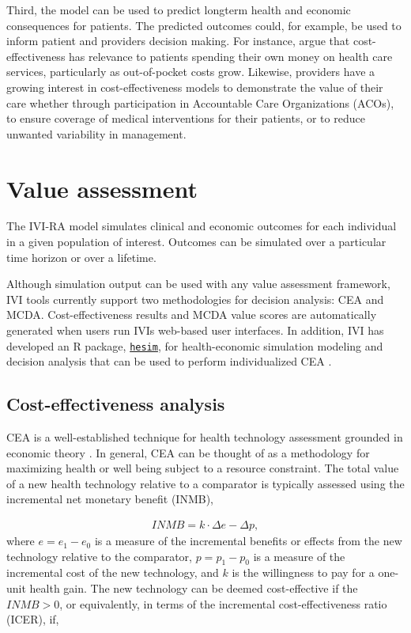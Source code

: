 \documentclass[11pt,final,fleqn]{article}\usepackage[]{graphicx}\usepackage[]{color}
\theoremstyle{plain}
\newcommand{\code}[1]{\texttt{#1}}
\begin{document}
Third, the model can be used to predict longterm health and economic consequences for patients. The predicted outcomes could, for example, be used to inform patient and providers decision making. For instance, \citet{ioannidis2011individualized} argue that cost-effectiveness has relevance to patients spending their own money on health care services, particularly as out-of-pocket costs grow. Likewise, providers have a growing interest in cost-effectiveness models to demonstrate the value of their care whether through participation in Accountable Care Organizations (ACOs), to ensure coverage of medical interventions for their patients, or to reduce unwanted variability in management. 

 \section{Value assessment}\label{sec:value-assessment}
The IVI-RA model simulates clinical and economic outcomes for each individual in a given population of interest. Outcomes can be simulated over a particular time horizon or over a lifetime. 

Although simulation output can be used with any value assessment framework, IVI tools currently support two methodologies for decision analysis: CEA and MCDA. Cost-effectiveness results and MCDA value scores are automatically generated when users run IVIs web-based user interfaces. In addition, IVI has developed an R package, \code{\href{https://innovationvalueinitiative.github.io/hesim/}{hesim}}, for health-economic simulation modeling and decision analysis that can be used to perform individualized CEA \citep{basu2007value, ioannidis2011individualized, espinoza2014value}. 

\subsection{Cost-effectiveness analysis}\label{sec:cea}
CEA is a well-established technique for health technology assessment grounded in economic theory \citep{meltzer2011theoretical}. In general, CEA can be thought of as a methodology for maximizing health or well being subject to a resource constraint. The total value of a new health technology relative to a comparator is typically assessed using the incremental net monetary benefit (INMB), 

\begin{align}
INMB = k \cdot \Delta e - \Delta p, 
\end{align}
where $e = e_1 - e_0$ is a measure of the incremental benefits or effects from the new technology relative to the comparator, $p = p_1 - p_0$ is a measure of the incremental cost of the new technology, and $k$ is the willingness to pay for a one-unit health gain. The new technology can be deemed cost-effective if the $INMB > 0$, or equivalently, in terms of the incremental cost-effectiveness ratio (ICER), if,
\end{document}
